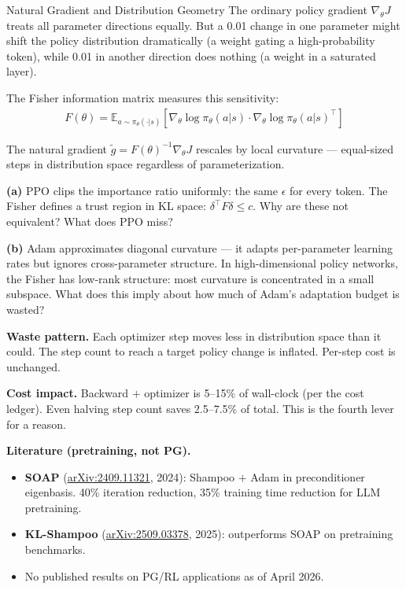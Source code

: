 \begin{thinkfirst}{Natural Gradient and Distribution Geometry}
The ordinary policy gradient $\nabla_\theta J$ treats all parameter directions equally. But a 0.01 change in one parameter might shift the policy distribution dramatically (a weight gating a high-probability token), while 0.01 in another direction does nothing (a weight in a saturated layer).

The Fisher information matrix measures this sensitivity:
\begin{align*}
  F(\theta) = \mathbb{E}_{a \sim \pi_\theta(\cdot|s)}\!\left[\nabla_\theta \log \pi_\theta(a|s) \cdot \nabla_\theta \log \pi_\theta(a|s)^\top\right]
\end{align*}

The natural gradient $\tilde{g} = F(\theta)^{-1} \nabla_\theta J$ rescales by local curvature --- equal-sized steps in distribution space regardless of parameterization.

\textbf{(a)} PPO clips the importance ratio uniformly: the same $\epsilon$ for every token. The Fisher defines a trust region in KL space: $\delta^\top F \delta \leq c$. Why are these not equivalent? What does PPO miss?

\textbf{(b)} Adam approximates diagonal curvature --- it adapts per-parameter learning rates but ignores cross-parameter structure. In high-dimensional policy networks, the Fisher has low-rank structure: most curvature is concentrated in a small subspace. What does this imply about how much of Adam's adaptation budget is wasted?
\end{thinkfirst}

\textbf{Waste pattern.} Each optimizer step moves less in distribution space than it could. The step count to reach a target policy change is inflated. Per-step cost is unchanged.

\textbf{Cost impact.} Backward $+$ optimizer is 5--15\% of wall-clock (per the cost ledger). Even halving step count saves 2.5--7.5\% of total. This is the fourth lever for a reason.

\textbf{Literature (pretraining, not PG).}
\begin{itemize}
  \item \textbf{SOAP} (\href{https://arxiv.org/abs/2409.11321}{arXiv:2409.11321}, 2024): Shampoo $+$ Adam in preconditioner eigenbasis. 40\% iteration reduction, 35\% training time reduction for LLM pretraining.
  \item \textbf{KL-Shampoo} (\href{https://arxiv.org/abs/2509.03378}{arXiv:2509.03378}, 2025): outperforms SOAP on pretraining benchmarks.
  \item No published results on PG/RL applications as of April 2026.
\end{itemize}

